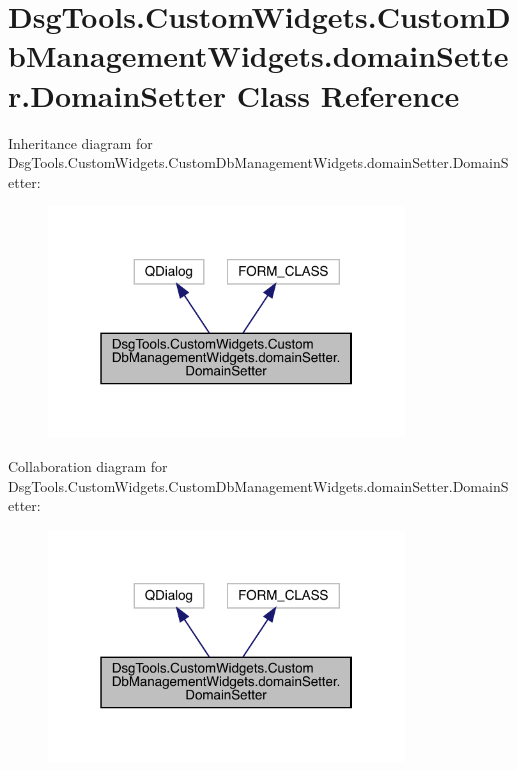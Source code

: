 \hypertarget{class_dsg_tools_1_1_custom_widgets_1_1_custom_db_management_widgets_1_1domain_setter_1_1_domain_setter}{}\section{Dsg\+Tools.\+Custom\+Widgets.\+Custom\+Db\+Management\+Widgets.\+domain\+Setter.\+Domain\+Setter Class Reference}
\label{class_dsg_tools_1_1_custom_widgets_1_1_custom_db_management_widgets_1_1domain_setter_1_1_domain_setter}


Inheritance diagram for Dsg\+Tools.\+Custom\+Widgets.\+Custom\+Db\+Management\+Widgets.\+domain\+Setter.\+Domain\+Setter\+:
\nopagebreak
\begin{figure}[H]
\begin{center}
\leavevmode
\includegraphics[width=268pt]{class_dsg_tools_1_1_custom_widgets_1_1_custom_db_management_widgets_1_1domain_setter_1_1_domain_setter__inherit__graph}
\end{center}
\end{figure}


Collaboration diagram for Dsg\+Tools.\+Custom\+Widgets.\+Custom\+Db\+Management\+Widgets.\+domain\+Setter.\+Domain\+Setter\+:
\nopagebreak
\begin{figure}[H]
\begin{center}
\leavevmode
\includegraphics[width=268pt]{class_dsg_tools_1_1_custom_widgets_1_1_custom_db_management_widgets_1_1domain_setter_1_1_domain_setter__coll__graph}
\end{center}
\end{figure}
